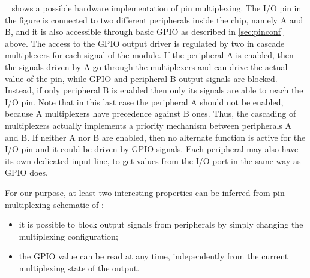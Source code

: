 \myfig{\ref{fig:pinmux}}~ shows a possible hardware implementation of pin multiplexing.
The I/O pin in the figure is connected to two different peripherals inside the chip, namely A and B,
and it is also accessible through basic GPIO as described in \sec \ref{sec:pinconf} above.
The access to the GPIO output driver is regulated by two in cascade multiplexers for each signal of the module.
If the peripheral A is enabled, then the signals driven by A go through the multiplexers and can drive the actual value of the pin,
while GPIO and peripheral B output signals are blocked. Instead, if only peripheral B is enabled then only its signals are able to reach the I/O pin.
Note that in this last case the peripheral A should not be enabled, because A multiplexers have precedence against B ones.
Thus, the cascading of multiplexers actually implements a priority mechanism between peripherals A and B.
If neither A nor B are enabled, then no alternate function is active for the I/O pin and it could be driven by GPIO signals.
Each peripheral may also have its own dedicated input line, to get values from the I/O port in the same way as GPIO does.

For our purpose, at least two interesting properties can be inferred from pin multiplexing schematic of \myfig{\ref{fig:pinmux}}:
\begin{itemize}
	\item it is possible to block output signals from peripherals by simply changing the multiplexing configuration;
	\item the GPIO value can be read at any time, independently from the current multiplexing state of the output.
\end{itemize}
